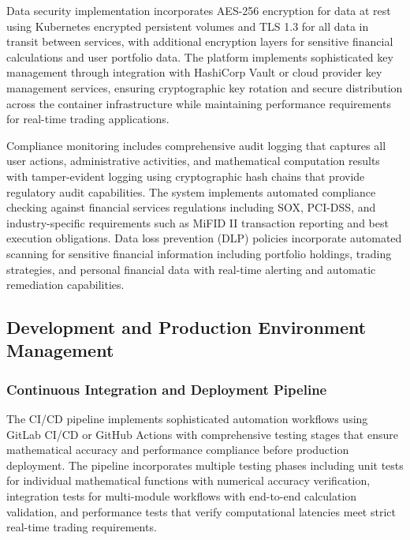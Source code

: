 \documentclass[12pt,a4paper]{article}
\theoremstyle{definition}
\theoremstyle{remark}
\begin{document}
Data security implementation incorporates AES-256 encryption for data at rest using Kubernetes encrypted persistent volumes and TLS 1.3 for all data in transit between services, with additional encryption layers for sensitive financial calculations and user portfolio data. The platform implements sophisticated key management through integration with HashiCorp Vault or cloud provider key management services, ensuring cryptographic key rotation and secure distribution across the container infrastructure while maintaining performance requirements for real-time trading applications.

Compliance monitoring includes comprehensive audit logging that captures all user actions, administrative activities, and mathematical computation results with tamper-evident logging using cryptographic hash chains that provide regulatory audit capabilities. The system implements automated compliance checking against financial services regulations including SOX, PCI-DSS, and industry-specific requirements such as MiFID II transaction reporting and best execution obligations. Data loss prevention (DLP) policies incorporate automated scanning for sensitive financial information including portfolio holdings, trading strategies, and personal financial data with real-time alerting and automatic remediation capabilities.

\subsection{Development and Production Environment Management}

\subsubsection{Continuous Integration and Deployment Pipeline}

The CI/CD pipeline implements sophisticated automation workflows using GitLab CI/CD or GitHub Actions with comprehensive testing stages that ensure mathematical accuracy and performance compliance before production deployment. The pipeline incorporates multiple testing phases including unit tests for individual mathematical functions with numerical accuracy verification, integration tests for multi-module workflows with end-to-end calculation validation, and performance tests that verify computational latencies meet strict real-time trading requirements.
\end{document}
